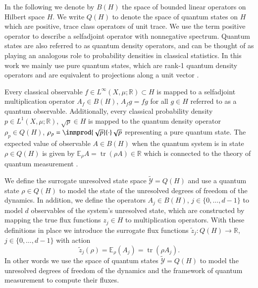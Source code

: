 \documentclass[letterpaper,10pt,3p,preprint]{elsarticle}
\newcommand{\Rbb}{\mathbb{R}}
\newcommand{\Ebb}{\mathbb{E}}
\newcommand{\Ycal}{\mathcal{Y}}
\DeclareMathOperator{\tr}{tr}
\begin{document}
In the following we denote by $B(H)$ the space of bounded linear
operators on Hilbert space $H$.
We write $Q(H)$ to denote the space of quantum states on $H$
which are positive, trace class operators of unit trace.
We use the term positive operator to describe a selfadjoint
operator with nonnegative spectrum.
Quantum states are also referred to as quantum density operators,
and can be thought of as playing an analogous role to probability
densities in classical statistics.
In this work we mainly use pure quantum states,
which are rank-1 quantum density operators and are
equivalent to projections along a unit vector
\cite{Hall2013,Sakurai2021,Takhtajan2008}.

Every classical observable
$f\in L^\infty(X,\mu;\Rbb)\subset H$
is mapped to a selfadjoint multiplication operator
$A_f\in B(H)$, $A_fg=fg$ for all $g\in H$
referred to as a quantum observable.
Additionally, every classical probability density
$p\in L^1(X,\mu;\Rbb)$, $\sqrt{p}\in H$
is mapped to the quantum density operator
$\rho_p\in Q(H)$,
$\rho_p=\innprod{\sqrt{p}}{\cdot}\sqrt{p}$
representing a pure quantum state.
The expected value of observable $A\in B(H)$
when the quantum system is in state $\rho\in Q(H)$
is given by
$\Ebb_\rho A=\tr(\rho A)\in\Rbb$
which is connected to the theory of quantum measurement
\cite{Hall2013,Sakurai2021,Takhtajan2008}.

We define the surrogate unresolved state space
$\tilde{\Ycal}=Q(H)$
and use a quantum state $\rho\in Q(H)$
to model the state of the unresolved degrees of freedom
of the dynamics.
In addition, we define the operators
$A_j\in B(H)$, $j\in\{0,\ldots, d-1\}$
to model $d$ observables of the system's unresolved state,
which are constructed by mapping the true flux functions
$z_j\in H$ to multiplication operators.
With these definitions in place we introduce the surrogate
flux functions
$\tilde{z}_j\colon Q(H)\rightarrow\Rbb$,
$j\in\{0,\ldots,d-1\}$
with action
\begin{equation*}
    \tilde{z}_j(\rho)=\Ebb_\rho(A_j)=\tr(\rho A_j).
\end{equation*}
In other words we use the space of quantum states
$\tilde{\Ycal}=Q(H)$
to model the unresolved degrees of freedom of the dynamics
and the framework of quantum measurement to compute their
fluxes.
\end{document}
